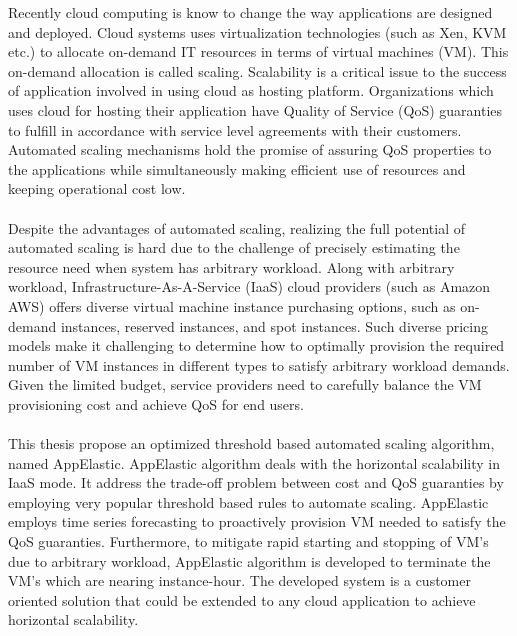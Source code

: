 
Recently cloud computing is know to change the way applications are designed and deployed. Cloud systems uses virtualization technologies (such as Xen, KVM etc.) to allocate on-demand IT resources in terms of virtual machines (VM). This on-demand allocation is called scaling. Scalability is a critical issue to the success of application involved in using cloud as hosting platform. Organizations which uses cloud for hosting their application have Quality of Service (QoS) guaranties to fulfill in accordance with service level agreements with their customers. Automated scaling mechanisms hold the promise of assuring QoS properties to the applications while simultaneously making efficient use of resources and keeping operational cost low.
\\
\\
Despite the advantages of automated scaling, realizing the full potential of automated scaling is hard due to the challenge of precisely estimating the resource need when system has arbitrary workload. Along with arbitrary workload, Infrastructure-As-A-Service (IaaS) cloud providers (such as Amazon AWS) offers diverse virtual machine instance purchasing options, such as on-demand instances, reserved instances, and spot instances. Such diverse pricing models make it challenging to determine how to optimally provision the required number of VM instances in different types to satisfy arbitrary workload demands. Given the limited budget, service providers need to carefully balance the VM provisioning cost and achieve QoS for end users.
\\
\\
This thesis propose an optimized threshold based automated scaling algorithm, named AppElastic. AppElastic algorithm deals with the horizontal scalability in IaaS mode. It address the trade-off problem between cost and QoS guaranties by employing very popular threshold based rules to automate scaling. AppElastic employs time series forecasting to proactively provision VM needed to satisfy the QoS guaranties. Furthermore, to mitigate rapid starting and stopping of VM's due to arbitrary workload, AppElastic algorithm is developed to terminate the VM's which are nearing instance-hour. The developed system is a customer oriented solution that could be extended to any cloud application to achieve horizontal scalability.
